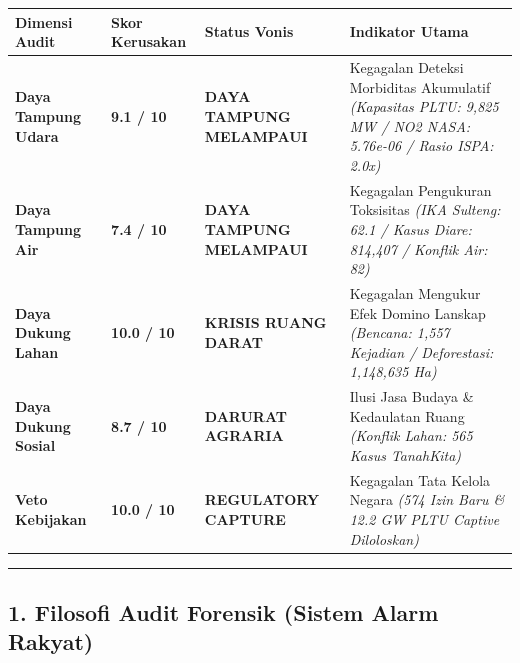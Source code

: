 \documentclass[
]{article}
\newcounter{none} %
\begin{document}
{\def\LTcaptype{none} %
\begin{longtable}[]{@{}
  >{\raggedright\arraybackslash}p{}
  >{\raggedright\arraybackslash}p{}
  >{\raggedright\arraybackslash}p{}
  >{\raggedright\arraybackslash}p{}@{}}
\toprule\noalign{}
\begin{minipage}[b]{\linewidth}\raggedright
Dimensi Audit
\end{minipage} & \begin{minipage}[b]{\linewidth}\raggedright
Skor Kerusakan
\end{minipage} & \begin{minipage}[b]{\linewidth}\raggedright
Status Vonis
\end{minipage} & \begin{minipage}[b]{\linewidth}\raggedright
Indikator Utama
\end{minipage} \\
\midrule\noalign{}
\endhead
\bottomrule\noalign{}
\endlastfoot
\textbf{Daya Tampung Udara} & \textbf{9.1 / 10} & \textbf{DAYA TAMPUNG
MELAMPAUI} & Kegagalan Deteksi Morbiditas Akumulatif \emph{(Kapasitas
PLTU: 9,825 MW / NO2 NASA: 5.76e-06 / Rasio ISPA: 2.0x)} \\
\textbf{Daya Tampung Air} & \textbf{7.4 / 10} & \textbf{DAYA TAMPUNG
MELAMPAUI} & Kegagalan Pengukuran Toksisitas \emph{(IKA Sulteng: 62.1 /
Kasus Diare: 814,407 / Konflik Air: 82)} \\
\textbf{Daya Dukung Lahan} & \textbf{10.0 / 10} & \textbf{KRISIS RUANG
DARAT} & Kegagalan Mengukur Efek Domino Lanskap \emph{(Bencana: 1,557
Kejadian / Deforestasi: 1,148,635 Ha)} \\
\textbf{Daya Dukung Sosial} & \textbf{8.7 / 10} & \textbf{DARURAT
AGRARIA} & Ilusi Jasa Budaya \& Kedaulatan Ruang \emph{(Konflik Lahan:
565 Kasus TanahKita)} \\
\textbf{Veto Kebijakan} & \textbf{10.0 / 10} & \textbf{REGULATORY
CAPTURE} & Kegagalan Tata Kelola Negara \emph{(574 Izin Baru \& 12.2 GW
PLTU Captive Diloloskan)} \\
\end{longtable}
}

\begin{center}\rule{0.5\linewidth}{0.5pt}\end{center}

\subsection{1. Filosofi Audit Forensik (Sistem Alarm
Rakyat)}\label{filosofi-audit-forensik-sistem-alarm-rakyat}
\end{document}
